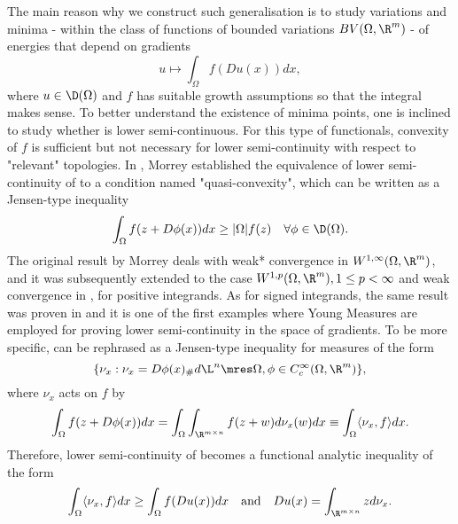 The main reason why we construct such generalisation is to study variations and minima - within the class of functions of bounded variations $BV(\Omega,\R^m)$ - of energies that depend on gradients
\begin{equation} \label{Introduction:eq:functional_gradient}
u\mapsto \int_\Omega f(Du(x))dx,
\end{equation}
where $u\in \D(\Omega)$ and $f$ has suitable growth assumptions so that the integral makes sense. To better understand the existence of minima points, one is inclined to study whether  is lower semi-continuous. For this type of functionals, convexity of $f$ is sufficient but not necessary for lower semi-continuity with respect to "relevant" topologies. In \cite{morrey1952}, Morrey established the equivalence of lower semi-continuity of  to a condition named "quasi-convexity", which can be written as a Jensen-type inequality
\begin{equation} \label{Introduction:eq:quasi_convexity}
\int_\Omega f(z+D\phi(x))dx \geq |\Omega|f(z) \quad \forall \phi\in \D(\Omega).
\end{equation}
The original result by Morrey deals with weak* convergence in $W^{1,\infty}(\Omega,\R^m)$, and it was subsequently extended to the case $W^{1,p}(\Omega,\R^m), 1\leq p<\infty$ and weak convergence in \cite{acerbi1984semicontinuity}, for positive integrands. As for signed integrands, the same result was proven in \cite{ball1990lower} and it is one of the first examples where Young Measures are employed for proving lower semi-continuity in the space of gradients. To be more specific,  can be rephrased as a Jensen-type inequality for measures of the form
\begin{equation} \label{pullback_gradients}
\{ \nu_x: \nu_x = D\phi(x)_\# d\L^n\mres \Omega, \phi\in C_c^\infty(\Omega, \R^m) \},
\end{equation}
where $\nu_x$ acts on $f$ by
\begin{equation}
\int_\Omega f(z+D\phi(x))dx = \int_\Omega \int_{\R^{m\times n}} f(z+w) d\nu_x(w) dx \equiv \int_\Omega \langle \nu_x,f\rangle dx.
\end{equation}
Therefore, lower semi-continuity of  becomes a functional analytic inequality of the form
\begin{align}
\int_\Omega \langle \nu_x,f\rangle dx \geq \int_\Omega f(Du(x))dx \quad \text{and} \quad Du(x) = \int_{\R^{m\times n}} zd\nu_x.
\end{align}

